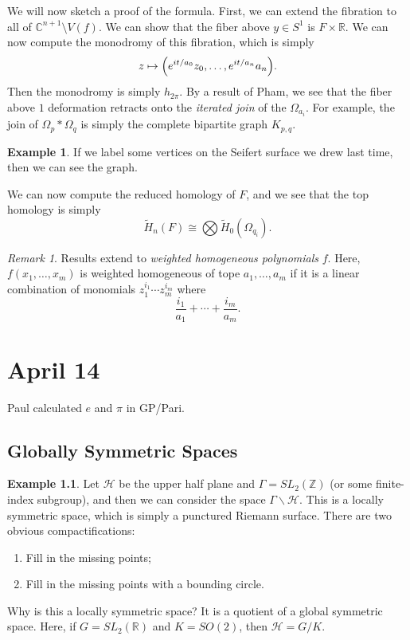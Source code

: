 \documentclass[leqno, openany]{memoir}
\theoremstyle{definition}
\newtheorem{exm}[thm]{Example}
\theoremstyle{remark}
\newtheorem{rmk}[thm]{Remark}
\theoremstyle{plain}
\theoremstyle{definition}
\theoremstyle{remark}
\newcommand{\R}{\mathbb{R}}
\newcommand{\C}{\mathbb{C}}
\newcommand{\Z}{\mathbb{Z}}
\newcommand{\mc}[1]{\mathcal{#1}}
\begin{document}
We will now sketch a proof of the formula. First, we can extend the fibration to all of $\C^{n+1} \setminus V(f)$. We can show that the fiber above $y \in S^1$ is $F \times \R$. We can now compute the monodromy of this fibration, which is simply
\[ z \mapsto \qty(e^{it/a_0} z_0, \ldots, e^{it/a_n} a_n). \]
Then the monodromy is simply $h_{2\pi}$. By a result of Pham, we see that
the fiber above $1$ deformation retracts onto the \textit{iterated join} of the $\Omega_{a_i}$. For example, the join of $\Omega_p * \Omega_q$ is simply the complete bipartite graph $K_{p,q}$.

\begin{exm}
    If we label some vertices on the Seifert surface we drew last time, then we can see the graph.
\end{exm}

We can now compute the reduced homology of $F$, and we see that the top homology is simply 
\[ \widetilde{H}_n(F) \cong \bigotimes \widetilde{H}_0(\Omega_{q_i}). \] 

\begin{rmk}
    Results extend to \textit{weighted homogeneous polynomials} $f$. Here, $f(x_1, \ldots, x_m)$ is weighted homogeneous of tope $a_1, \ldots, a_m$ if it is a linear combination of monomials $z_1^{i_1} \cdots z_m^{i_m}$ where
    \[ \frac{i_1}{a_1} + \cdots + \frac{i_m}{a_m}. \]  
\end{rmk}

\chapter{April 14}%
\label{cha:april_14}

Paul calculated $e$ and $\pi$ in GP/Pari.

\section{Globally Symmetric Spaces}%
\label{sec:Globally_symmetric_spaces}

\begin{exm}
    Let $\mc{H}$ be the upper half plane and $\Gamma = SL_2(\Z)$ (or some finite-index subgroup), and then we can consider the space $\Gamma \backslash \mc{H}$. This is a locally symmetric space, which is simply a punctured Riemann surface. There are two obvious compactifications:
    \begin{enumerate}
        \item Fill in the missing points;
        \item Fill in the missing points with a bounding circle.
    \end{enumerate}
    Why is this a locally symmetric space? It is a quotient of a global symmetric space. Here, if $G = SL_2(\R)$ and $K = SO(2)$, then $\mc{H} = G/K$.
\end{exm}
\end{document}
